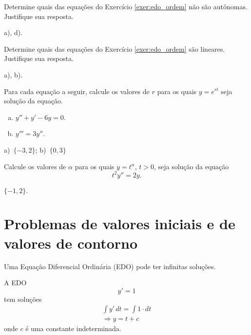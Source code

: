 \begin{exer}
  Determine quais das equações do Exercício \ref{exer:edo_ordem} não são autônomas. Justifique sua resposta.
\end{exer}
\begin{resp}
  a), d).
\end{resp}

\begin{exer}
  Determine quais das equações do Exercício \ref{exer:edo_ordem} são lineares. Justifique sua resposta.
\end{exer}
\begin{resp}
  a), b).
\end{resp}

\begin{exer}
  Para cada equação a seguir, calcule os valores de $r$ para os quais $y = e^{rt}$ seja solução da equação.
  \begin{enumerate}[a)]
  \item $y'' + y' - 6y = 0$.
  \item $y''' = 3y''$.
  \end{enumerate}
\end{exer}
\begin{resp}
  a)~$\{-3, 2\}$; b)~$\{0, 3\}$
\end{resp}

\begin{exer}
  Calcule os valores de $\alpha$ para os quais $y = t^\alpha$, $t>0$, seja solução da equação
  \begin{equation}
    t^2y'' = 2y.
  \end{equation}
\end{exer}
\begin{resp}
  $\{-1, 2\}$.
\end{resp}


\section{Problemas de valores iniciais e de valores de contorno}\label{cap_intro_sec_pv}

Uma Equação Diferencial Ordinária (EDO) pode ter infinitas soluções.

\begin{ex}
A EDO
\begin{equation}
  y' = 1
\end{equation}
tem soluções
\begin{gather}
  \int y'\,dt = \int 1\cdot dt\\
  \Rightarrow y = t + c
\end{gather}
onde $c$ é uma constante indeterminada.
\end{ex}

